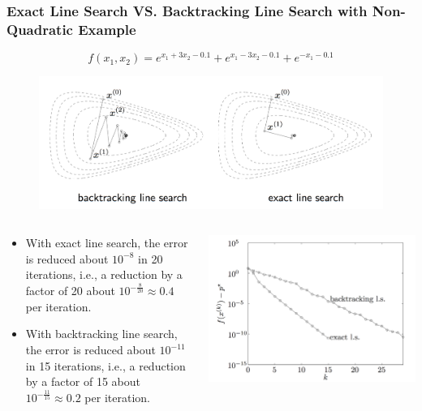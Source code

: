 \begin{frame}
  \frametitle{Exact Line Search VS.  Backtracking Line Search with
    Non-Quadratic Example}
$$f(x_1, x_2) = e^{x_1+3x_2-0.1} + e^{x_1-3x_2-0.1} + e^{-x_1-0.1}$$

\begin{figure}
\centering
\includegraphics[scale=0.25]{pics/btes.png}
\end{figure}



\begin{columns}
  \begin{column}{0.6\textwidth}
{\tiny
    \begin{itemize}
    \item With exact line search, the error is reduced about $10^{-8}$
      in 20 iterations, i.e., a reduction by a factor of
20 about $10^{-\frac{8}{20}} \approx 0.4$ per iteration.
\item With backtracking line search, the error is reduced
about $10^{-11}$ in 15 iterations, i.e., a reduction by a factor of
15 about $10^{-\frac{11}{15}} \approx 0.2$ per iteration.
    \end{itemize}
}
  \end{column}

\begin{column}{0.5\textwidth}
\includegraphics[scale = 0.12]{pics/els.png}

\end{column}

\end{columns}
\end{frame}


